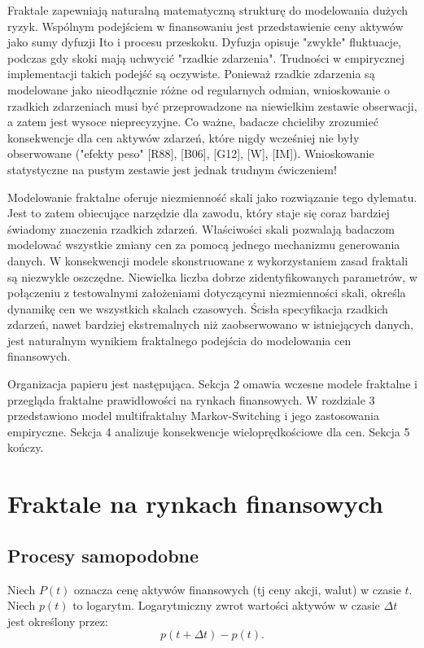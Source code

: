 \documentclass[12pt]{article}
\theoremstyle{definition}
\begin{document}
Fraktale zapewniają naturalną matematyczną strukturę do modelowania dużych ryzyk. Wspólnym podejściem w finansowaniu jest przedstawienie ceny aktywów jako sumy dyfuzji Ito i procesu przeskoku. Dyfuzja opisuje "zwykłe" fluktuacje, podczas gdy skoki mają uchwycić "rzadkie zdarzenia". Trudności w empirycznej implementacji takich podejść są oczywiste. Ponieważ rzadkie zdarzenia są modelowane jako nieodłącznie różne od regularnych odmian, wnioskowanie o rzadkich zdarzeniach musi być przeprowadzone na niewielkim zestawie obserwacji, a zatem jest wysoce nieprecyzyjne. Co ważne, badacze chcieliby zrozumieć konsekwencje dla cen aktywów zdarzeń, które nigdy wcześniej nie były obserwowane ("efekty peso" [R88], [B06], [G12], [W], [IM]). Wnioskowanie statystyczne na pustym zestawie jest jednak trudnym ćwiczeniem!

Modelowanie fraktalne oferuje niezmienność skali jako rozwiązanie tego dylematu. Jest to zatem obiecujące narzędzie dla zawodu, który staje się coraz bardziej świadomy znaczenia rzadkich zdarzeń. Właściwości skali pozwalają badaczom modelować wszystkie zmiany cen za pomocą jednego mechanizmu generowania danych. W konsekwencji modele skonstruowane z wykorzystaniem zasad fraktali są niezwykle oszczędne. Niewielka liczba dobrze zidentyfikowanych parametrów, w połączeniu z testowalnymi założeniami dotyczącymi niezmienności skali, określa dynamikę cen we wszystkich skalach czasowych. Ścisła specyfikacja rzadkich zdarzeń, nawet bardziej ekstremalnych niż zaobserwowano w istniejących danych, jest naturalnym wynikiem fraktalnego podejścia do modelowania cen finansowych.

Organizacja papieru jest następująca. Sekcja 2 omawia wczesne modele fraktalne i przegląda fraktalne prawidłowości na rynkach finansowych. W rozdziale 3 przedstawiono model multifraktalny Markov-Switching i jego zastosowania empiryczne. Sekcja 4 analizuje konsekwencje wieloprędkościowe dla cen. Sekcja 5 kończy.

\section{Fraktale na rynkach finansowych}

\subsection{Procesy samopodobne}
Niech $P(t)$ oznacza cenę aktywów finansowych (tj ceny akcji, walut) w czasie $t$. Niech $p(t)$ to logarytm. Logarytmiczny zwrot wartości aktywów w czasie $\Delta t$ jest określony przez:
$$p(t+\Delta t)-p(t).$$
\end{document}
